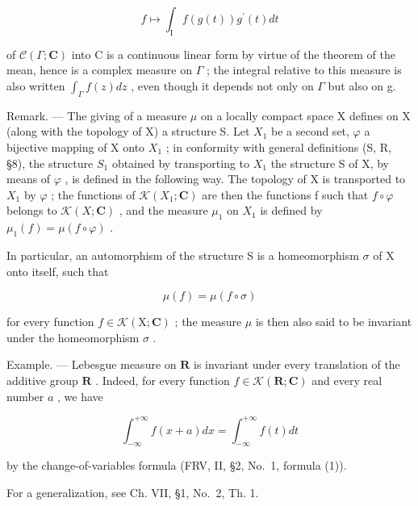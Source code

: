 \[
f \mapsto \int_ {\mathrm{I}} f (g (t)) g ^ {\prime} (t) d t
\]

of \(\mathcal{C}(\Gamma;\mathbf{C})\) into C is a continuous linear form by virtue of the theorem of the mean, hence is a complex measure on \(\Gamma\) ; the integral relative to this measure is also written \(\int_{\Gamma} f(z) dz\) , even though it depends not only on \(\Gamma\) but also on g.

Remark. --- The giving of a measure \(\mu\) on a locally compact space X defines on X (along with the topology of X) a structure S. Let \(X_{1}\) be a second set, \(\varphi\) a bijective mapping of X onto \(X_{1}\) ; in conformity with general definitions (S, R, §8), the structure \(S_{1}\) obtained by transporting to \(X_{1}\) the structure S of X, by means of \(\varphi\) , is defined in the following way. The topology of X is transported to \(X_{1}\) by \(\varphi\) ; the functions of \(\mathcal{K}(X_{1};\mathbf{C})\) are then the functions f such that \(f \circ \varphi\) belongs to \(\mathcal{K}(X;\mathbf{C})\) , and the measure \(\mu_{1}\) on \(X_{1}\) is defined by \(\mu_{1}(f) = \mu(f \circ \varphi)\) .

In particular, an automorphism of the structure S is a homeomorphism \(\sigma\) of X onto itself, such that

\[
\mu (f) = \mu (f \circ \sigma)
\]

for every function \(f \in \mathcal{K}(\mathrm{X};\mathbf{C})\) ; the measure \(\mu\) is then also said to be invariant under the homeomorphism \(\sigma\) .

Example. --- Lebesgue measure on \(\mathbf{R}\) is invariant under every translation of the additive group \(\mathbf{R}\) . Indeed, for every function \(f \in \mathcal{K}(\mathbf{R}; \mathbf{C})\) and every real number \(a\) , we have

\[
\int_ {- \infty} ^ {+ \infty} f (x + a) d x = \int_ {- \infty} ^ {+ \infty} f (t) d t
\]

by the change-of-variables formula (FRV, II, §2, No.~1, formula (1)).

For a generalization, see Ch. VII, §1, No.~2, Th. 1.

